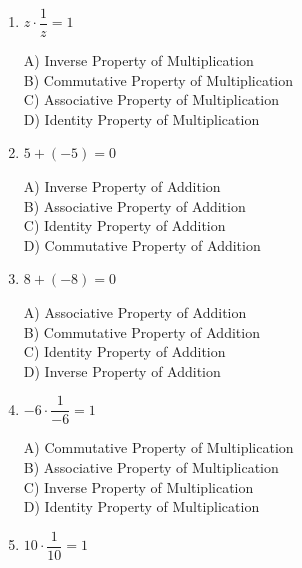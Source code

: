 \documentclass[11pt]{article}
\begin{document}
\begin{enumerate}
\begin{minipage}{\linewidth}
D) Commutative Property of Addition
\end{minipage}
  \vspace{0.3cm}
  \item $z \cdot \dfrac{1}{z} = 1$
\\[2pt]
\begin{minipage}{\linewidth}
A) Inverse Property of Multiplication \\
B) Commutative Property of Multiplication \\
C) Associative Property of Multiplication \\
D) Identity Property of Multiplication
\end{minipage}
  \vspace{0.3cm}
  \item $5 + (-5) = 0$
\\[2pt]
\begin{minipage}{\linewidth}
A) Inverse Property of Addition \\
B) Associative Property of Addition \\
C) Identity Property of Addition \\
D) Commutative Property of Addition
\end{minipage}
  \vspace{0.3cm}
  \item $8 + (-8) = 0$
\\[2pt]
\begin{minipage}{\linewidth}
A) Associative Property of Addition \\
B) Commutative Property of Addition \\
C) Identity Property of Addition \\
D) Inverse Property of Addition
\end{minipage}
  \vspace{0.3cm}
  \item $-6 \cdot \dfrac{1}{-6} = 1$
\\[2pt]
\begin{minipage}{\linewidth}
A) Commutative Property of Multiplication \\
B) Associative Property of Multiplication \\
C) Inverse Property of Multiplication \\
D) Identity Property of Multiplication
\end{minipage}
  \vspace{0.3cm}
  \item $10 \cdot \dfrac{1}{10} = 1$
\\[2pt]
\begin{minipage}{\linewidth}

\end{minipage}
\end{enumerate}
\end{document}
